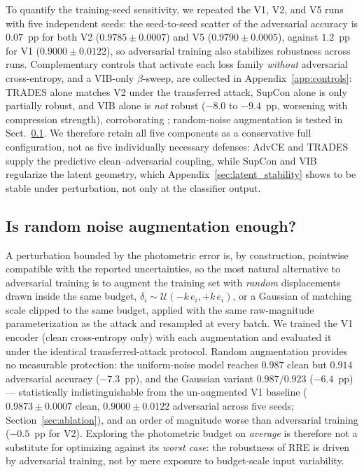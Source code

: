 \documentclass{aa}
\begin{document}
To quantify the training-seed sensitivity, we repeated the V1, V2, and V5
runs with five independent seeds: the seed-to-seed scatter of the
adversarial accuracy is $0.07$~pp for both V2 ($0.9785 \pm 0.0007$) and V5
($0.9790 \pm 0.0005$), against $1.2$~pp for V1 ($0.9000 \pm 0.0122$), so
adversarial training also stabilizes robustness across runs.
Complementary controls that activate each loss family \emph{without}
adversarial cross-entropy, and a VIB-only $\beta$-sweep, are collected in
Appendix~\ref{app:controls}: TRADES alone matches V2 under the transferred
attack, SupCon alone is only partially robust, and VIB alone is
\emph{not} robust ($-8.0$ to $-9.4$~pp, worsening with compression
strength), corroborating \citet{korshunova2021closer}; random-noise
augmentation is tested in Sect.~\ref{sec:noise_baseline}. We therefore
retain all five components as a conservative full configuration, not as
five individually necessary defenses: AdvCE and TRADES supply the
predictive clean--adversarial coupling, while SupCon and VIB regularize the latent geometry, which Appendix~\ref{sec:latent_stability} shows to be
stable under perturbation, not only at the classifier output.

\subsection{Is random noise augmentation enough?}
\label{sec:noise_baseline}
A perturbation bounded by the photometric error is, by construction,
pointwise compatible with the reported uncertainties, so the most natural
alternative to adversarial training is to augment the training set with
\emph{random} displacements drawn inside the same budget,
$\delta_i \sim \mathcal{U}(-k\,e_i, +k\,e_i)$, or a Gaussian of matching
scale clipped to the same budget, applied with the same raw-magnitude
parameterization as the attack and resampled at every batch. We trained
the V1 encoder (clean cross-entropy only) with each augmentation and
evaluated it under the identical transferred-attack protocol.
Random augmentation provides no measurable protection: the
uniform-noise model reaches $0.987$ clean but $0.914$ adversarial accuracy
($-7.3$~pp), and the Gaussian variant $0.987/0.923$ ($-6.4$~pp) ---
statistically indistinguishable from the un-augmented V1 baseline
($0.9873 \pm 0.0007$ clean, $0.9000 \pm 0.0122$ adversarial across five
seeds; Section~\ref{sec:ablation}), and an order of magnitude worse than
adversarial training ($-0.5$~pp for V2). Exploring the photometric budget
on \emph{average} is therefore not a substitute for optimizing against its
\emph{worst case}: the robustness of RRE is driven by adversarial
training, not by mere exposure to budget-scale input variability.
\end{document}
